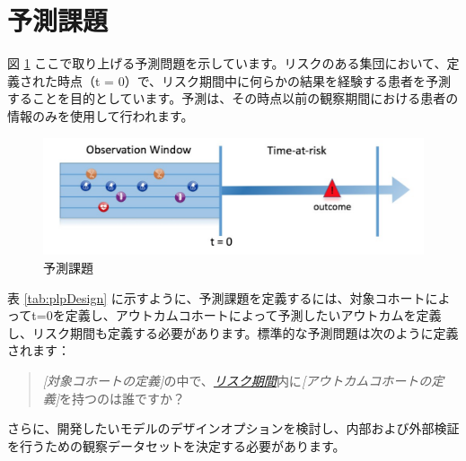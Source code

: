 \documentclass[
  11pt]{book}
\theoremstyle{definition}
\theoremstyle{definition}
\theoremstyle{definition}
\theoremstyle{definition}
\theoremstyle{remark}
\begin{document}
\section{予測課題}\label{ux4e88ux6e2cux8ab2ux984c}

図 \ref{fig:figure1} ここで取り上げる予測問題を示しています。リスクのある集団において、定義された時点（t = 0）で、リスク期間中に何らかの結果を経験する患者を予測することを目的としています。予測は、その時点以前の観察期間における患者の情報のみを使用して行われます。

\begin{figure}
\includegraphics[width=1\linewidth]{images/PatientLevelPrediction/Figure1} \caption{予測課題}\label{fig:figure1}
\end{figure}

表 \ref{tab:plpDesign} に示すように、予測課題を定義するには、対象コホートによってt=0を定義し、アウトカムコホートによって予測したいアウトカムを定義し、リスク期間も定義する必要があります。標準的な予測問題は次のように定義されます：   

\begin{quote}
\emph{{[}対象コホートの定義{]}}の中で、\emph{\hyperref[ux30eaux30b9ux30afux671fux9593]{リスク期間}}内に\emph{{[}アウトカムコホートの定義{]}}を持つのは誰ですか？
\end{quote}

さらに、開発したいモデルのデザインオプションを検討し、内部および外部検証を行うための観察データセットを決定する必要があります。
\end{document}
